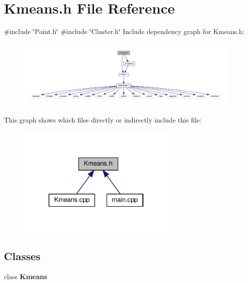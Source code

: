 \section{Kmeans.\+h File Reference}
\label{_kmeans_8h}
{\ttfamily \#include \char`\"{}Point.\+h\char`\"{}}\newline
{\ttfamily \#include \char`\"{}Cluster.\+h\char`\"{}}\newline
Include dependency graph for Kmeans.\+h\+:\nopagebreak
\begin{figure}[H]
\begin{center}
\leavevmode
\includegraphics[width=350pt]{_kmeans_8h__incl}
\end{center}
\end{figure}
This graph shows which files directly or indirectly include this file\+:\nopagebreak
\begin{figure}[H]
\begin{center}
\leavevmode
\includegraphics[width=226pt]{_kmeans_8h__dep__incl}
\end{center}
\end{figure}
\subsection*{Classes}
\begin{DoxyCompactItemize}
\item 
class \textbf{ Kmeans}
\end{DoxyCompactItemize}

